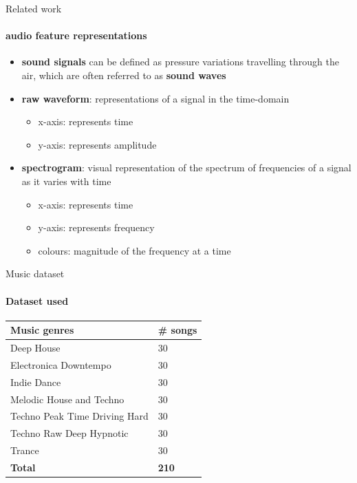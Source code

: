 \documentclass[aspectratio=169, professionalfonts]{beamer}
\begin{document}
\appendix

\begin{frame}{Related work}
	\framesubtitle{audio feature representations}
	\begin{itemize}
	    \item \textbf{sound signals} can be defined as pressure variations travelling through the air, which are often referred to as \textbf{sound waves}
		\item \textbf{raw waveform}: representations of a signal in the time-domain\\
		\begin{itemize}
		    \item x-axis: represents time
		    \item y-axis: represents amplitude
		\end{itemize}
		\item \textbf{spectrogram}: visual representation of the spectrum of frequencies of a signal as it varies with time\\
		\begin{itemize}
		    \item x-axis: represents time
		    \item y-axis: represents frequency
		    \item colours: magnitude of the frequency at a time
		\end{itemize}
	\end{itemize}
\end{frame}

\begin{frame}{Music dataset}
    \framesubtitle{Dataset used}
    \begin{table}[htbp]
        \centering
    	\label{tab:Music-Dataset}
    	\small
        \begin{tabular}{p{} | p{}}
            \toprule
            \textbf{Music genres} & \textbf{\# songs} \\ 
            \midrule[1pt]
            Deep House & 30 \\
            \hline
            Electronica Downtempo & 30 \\ 
            \hline
            Indie Dance & 30 \\ 
            \hline
            Melodic House and Techno & 30 \\ 
            \hline
            Techno Peak Time Driving Hard & 30 \\ 
            \hline
            Techno Raw Deep Hypnotic & 30 \\ 
            \hline
            Trance & 30 \\
            \midrule[1pt]
            \textbf{Total} & \textbf{210} \\
            \bottomrule
        \end{tabular}
    \end{table}
\end{frame}
\end{document}
